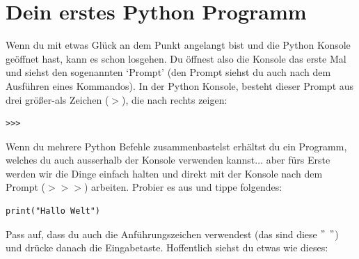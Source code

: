 \section{Dein erstes Python Programm}

Wenn du mit etwas Glück an dem Punkt angelangt bist und die Python Konsole geöffnet hast, kann es schon losgehen. Du öffnest also die Konsole das erste Mal und siehst den sogenannten `Prompt' (den Prompt siehst du auch nach dem Ausführen eines Kommandos). In der Python Konsole, besteht dieser Prompt aus drei größer-als Zeichen ($>$), die nach rechts zeigen:

\begin{Verbatim}[frame=single]
>>>
\end{Verbatim}

Wenn du mehrere Python Befehle zusammenbastelst erhältst du ein Programm, welches du auch ausserhalb der Konsole verwenden kannst$\ldots$ aber fürs Erste werden wir die Dinge einfach halten und direkt mit der Konsole nach dem Prompt ($>>>$) arbeiten. Probier es aus und tippe folgendes:

\begin{Verbatim}[frame=single]
print("Hallo Welt")
\end{Verbatim}

Pass auf, dass du auch die Anführungszeichen verwendest (das sind diese $"$ $"$) und drücke danach die Eingabetaste. Hoffentlich siehst du etwas wie dieses:

